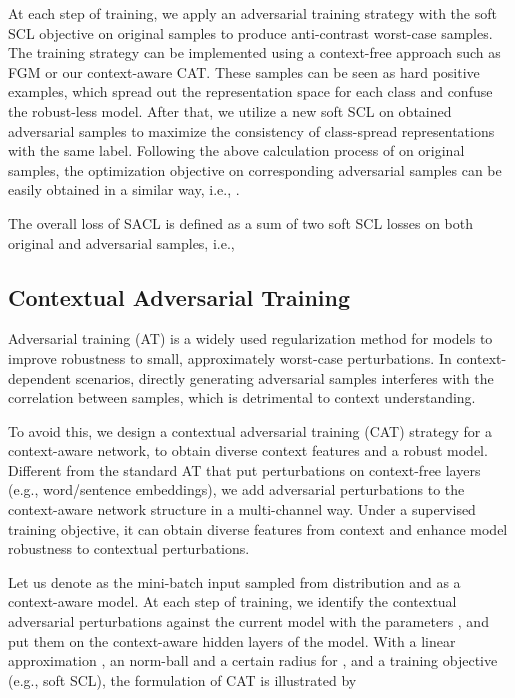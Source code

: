 \documentclass[11pt]{article}
\begin{document}
At each step of training, we apply an adversarial training strategy with the soft SCL objective on original samples to produce anti-contrast worst-case samples. 
The training strategy can be implemented using a context-free approach such as FGM \citep{DBLP:conf/iclr/MiyatoDG17} or our context-aware CAT.  
These samples can be seen as hard positive examples, which spread out the representation space for each class and confuse the robust-less model.
After that, we utilize a new soft SCL on obtained adversarial samples to maximize the consistency of class-spread representations with the same label. 
Following the above calculation process 
of  
on original samples, the optimization objective on corresponding adversarial samples can be easily obtained in a similar way, i.e., .
 
The overall loss of SACL is defined as a sum of two soft SCL losses on both original and adversarial samples, i.e.,


\subsection{Contextual Adversarial Training}
Adversarial training (AT) \cite{DBLP:journals/corr/GoodfellowSS14,DBLP:conf/iclr/MiyatoDG17} is a widely used regularization method for models to improve robustness to small, approximately worst-case perturbations. In context-dependent scenarios, directly generating adversarial samples interferes with the correlation between samples, which is detrimental to context understanding.

To avoid this, we design a contextual adversarial training (CAT) strategy for a context-aware network, to obtain diverse context features and a robust model.
Different from the standard AT that put perturbations on context-free layers (e.g., word/sentence embeddings), we add adversarial perturbations to the context-aware network structure in a multi-channel way. Under a supervised training objective, it can obtain diverse features from context and enhance model robustness to contextual perturbations.

Let us denote  as the mini-batch input sampled from distribution  and  as a context-aware model.
At each step of training, we identify the contextual adversarial perturbations  against the current model with the parameters , and put them on the context-aware hidden layers of the model.
With a linear approximation \cite{DBLP:journals/corr/GoodfellowSS14}, an  norm-ball and a certain radius  for , and a training objective  (e.g., soft SCL), the formulation of CAT is illustrated by
\end{document}
